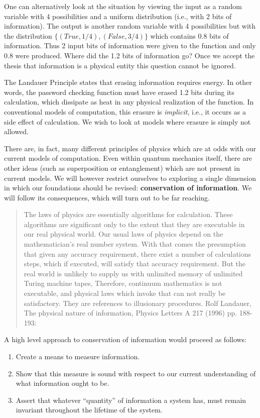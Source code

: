 \documentclass{article}
\begin{document}
One can alternatively look at the situation by viewing the input as a
random variable with 4 possibilities and a uniform distribution (i.e.,
with 2 bits of information). The output is another random variable
with 4 possibilities but with the distribution
$\{ (True, 1/4), (False, 3/4) \}$ which contains 0.8 bits of
information. Thus 2 input bits of information were given to the
function and only 0.8 were produced. Where did the 1.2 bits of
information go? Once we accept the thesis that information is a
physical entity this question cannot be ignored.

The Landauer Principle states that erasing information requires
energy. In other words, the password checking function must have
erased 1.2 bits during its calculation, which dissipate as heat in any
physical realization of the function. In conventional models of
computation, this erasure is \emph{implicit}, i.e., it occurs as a
side effect of calculation. We wish to look at models where
erasure is simply not allowed.

There are, in fact, many different principles of physics which are at
odds with our current models of computation. Even within quantum
mechanics itself, there are other ideas (such as superposition or
entanglement) which are not present in current models. We will however
restrict ourselves to exploring a single dimension in which our
foundations should be revised: \textbf{conservation of information}.
We will follow its consequences, which will turn out to be far
reaching.

\begin{quote}
  The laws of physics are essentially algorithms for calculation. These
  algorithms are significant only to the extent that they are executable in
  our real physical world. Our usual laws of physics depend on the
  mathematician's real number system. With that comes the presumption that
  given any accuracy requirement, there exist a number of calculations steps,
  which if executed, will satisfy that accuracy requirement. But the real
  world is unlikely to supply us with unlimited memory of unlimited Turing
  machine tapes, Therefore, continuum mathematics is not executable, and
  physical laws which invoke that can not really be satisfactory. They are
  references to illusionary procedures. Rolf Landauer, The physical nature of
  information, Physics Letters A 217 (1996) pp. 188-193:
\end{quote}

A high level approach to conservation of information would proceed
as follows:
\begin{enumerate}
\item Create a means to measure information.
\item Show that this measure is sound with respect to our current understanding
of what information ought to be.
\item Assert that whatever ``quantity'' of information a system has, must
remain invariant throughout the lifetime of the system.
\end{enumerate}
\end{document}
